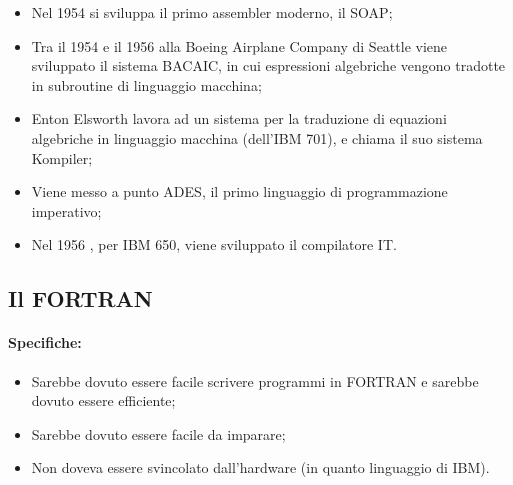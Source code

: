 \begin{itemize}
    \item Nel 1954 si sviluppa il primo assembler moderno, il SOAP;
    \item Tra il 1954 e il 1956 alla Boeing Airplane Company di Seattle
    viene sviluppato il sistema BACAIC, in cui espressioni algebriche
    vengono tradotte in subroutine di linguaggio macchina;
    \item Enton
    Elsworth lavora ad un sistema per la traduzione di equazioni
    algebriche in linguaggio macchina (dell’IBM 701), e chiama il suo
    sistema Kompiler;
    \item Viene messo a punto ADES, il primo linguaggio di programmazione imperativo;
    \item Nel 1956 , per IBM 650, viene sviluppato il compilatore IT.
\end{itemize}


\subsection{Il FORTRAN}


\paragraph{Specifiche:}

\begin{itemize}
    \item Sarebbe dovuto essere facile scrivere programmi in FORTRAN e sarebbe dovuto essere
    efficiente;
    \item Sarebbe dovuto essere facile da imparare;
    \item Non doveva essere svincolato dall'hardware (in quanto linguaggio di IBM).
\end{itemize}

